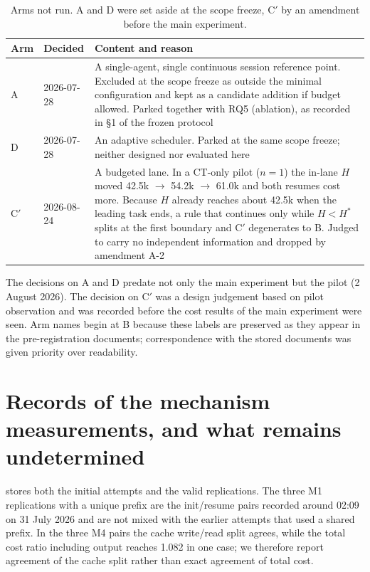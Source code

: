 \documentclass[a4paper,11pt]{article}
\newcommand{\spec}[1]{\texttt{\detokenize{#1}}}
\begin{document}
\begin{table}[!htbp]
\centering\small
\begin{tabularx}{\linewidth}{llY}
\toprule Arm & Decided & Content and reason\\\midrule
A & 2026-07-28 & A single-agent, single continuous session reference point. Excluded at the scope freeze as outside the minimal configuration and kept as a candidate addition if budget allowed. Parked together with RQ5 (ablation), as recorded in \S1 of the frozen protocol\\
D & 2026-07-28 & An adaptive scheduler. Parked at the same scope freeze; neither designed nor evaluated here\\
C$'$ & 2026-08-24 & A budgeted lane. In a CT-only pilot ($n=1$) the in-lane $H$ moved 42.5k $\to$ 54.2k $\to$ 61.0k and both resumes cost more. Because $H$ already reaches about 42.5k when the leading task ends, a rule that continues only while $H<H^*$ splits at the first boundary and C$'$ degenerates to B. Judged to carry no independent information and dropped by amendment A-2\\
\bottomrule
\end{tabularx}
\caption{Arms not run. A and D were set aside at the scope freeze, C$'$ by an amendment before the main experiment.}
\label{tab:parked}
\end{table}

The decisions on A and D predate not only the main experiment but the pilot (2 August 2026). The decision on C$'$ was a design judgement based on pilot observation and was recorded before the cost results of the main experiment were seen. Arm names begin at B because these labels are preserved as they appear in the pre-registration documents; correspondence with the stored documents was given priority over readability.

\section{Records of the mechanism measurements, and what remains undetermined}\label{app:probes}
\spec{probes/resume_probe_results.jsonl} stores both the initial attempts and the valid replications. The three M1 replications with a unique prefix are the init/resume pairs recorded around 02:09 on 31 July 2026 and are not mixed with the earlier attempts that used a shared prefix. In the three M4 pairs the cache write/read split agrees, while the total cost ratio including output reaches 1.082 in one case; we therefore report agreement of the cache split rather than exact agreement of total cost.
\end{document}
